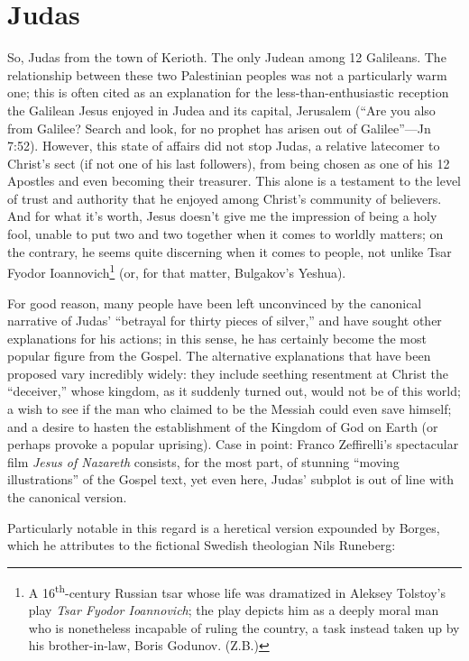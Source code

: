\chapter*{Judas}

So, Judas from the town of Kerioth. The only Judean among 12 Galileans. The relationship between these two Palestinian peoples was not a particularly warm one; this is often cited as an explanation for the less-than-enthusiastic reception the Galilean Jesus enjoyed in Judea and its capital, Jerusalem (``Are you also from Galilee? Search and look, for no prophet has arisen out of Galilee''---Jn 7:52). However, this state of affairs did not stop Judas, a relative latecomer to Christ's sect (if not one of his last followers), from being chosen as one of his 12 Apostles and even becoming their treasurer. This alone is a testament to the level of trust and authority that he enjoyed among Christ's community of believers. And for what it's worth, Jesus doesn't give me the impression of being a holy fool, unable to put two and two together when it comes to worldly matters; on the contrary, he seems quite discerning when it comes to people, not unlike Tsar Fyodor Ioannovich\footnote{A 16\textsuperscript{th}-century Russian tsar whose life was dramatized in Aleksey Tolstoy's play \emph{Tsar Fyodor Ioannovich}; the play depicts him as a deeply moral man who is nonetheless incapable of ruling the country, a task instead taken up by his brother-in-law, Boris Godunov. (Z.B.)} (or, for that matter, Bulgakov's Yeshua).

For good reason, many people have been left unconvinced by the canonical narrative of Judas' ``betrayal for thirty pieces of silver,'' and have sought other explanations for his actions; in this sense, he has certainly become the most popular figure from the Gospel. The alternative explanations that have been proposed vary incredibly widely: they include seething resentment at Christ the ``deceiver,'' whose kingdom, as it suddenly turned out, would not be of this world; a wish to see if the man who claimed to be the Messiah could even save himself; and a desire to hasten the establishment of the Kingdom of God on Earth (or perhaps provoke a popular uprising). Case in point: Franco Zeffirelli's spectacular film \emph{Jesus of Nazareth} consists, for the most part, of stunning ``moving illustrations'' of the Gospel text, yet even here, Judas' subplot is out of line with the canonical version.

Particularly notable in this regard is a heretical version expounded by Borges, which he attributes to the fictional Swedish theologian Nils Runeberg:

